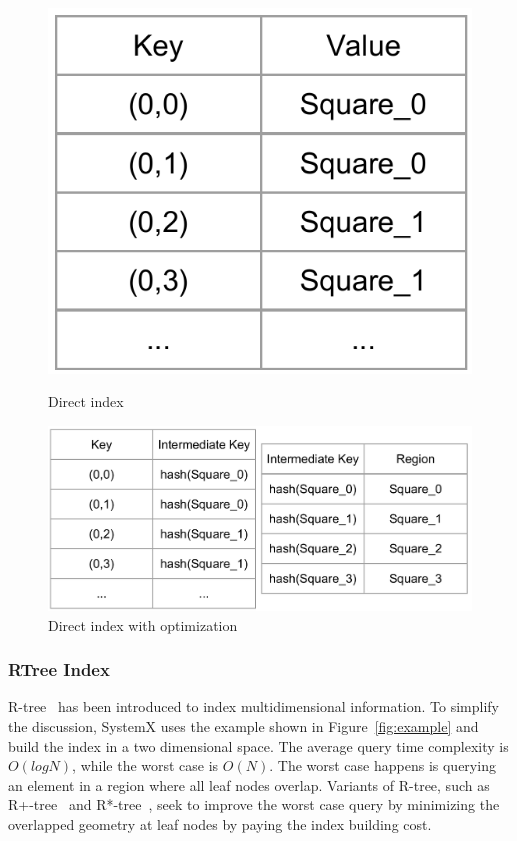 \documentclass{sig-alternate}
\begin{document}
\begin{figure}
\centering
\begin{minipage}{.3\linewidth}
  \includegraphics[width=\linewidth]{pictures/direct}
  \caption{Direct index}
  \label{fig:direct}
\end{minipage}
\hspace{.05\linewidth}
\begin{minipage}{.6\linewidth}
  \includegraphics[width=\linewidth]{pictures/direct-optimized}
  \caption{Direct index with optimization}
  \label{fig:direct-optimized}
\end{minipage}
\end{figure}


\subsubsection{RTree Index}
R-tree~\cite{guttman1984} has been introduced to index multidimensional information.
To simplify the discussion, SystemX uses the example shown in Figure~\ref{fig:example} and build the index in a two dimensional space.
The average query time complexity is $O(logN)$, while the worst case is $O(N)$. 
The worst case happens is querying an element in a region where all leaf nodes overlap.
Variants of R-tree, such as R+-tree~\cite{sellis1987} and R*-tree~\cite{beckmann1990}, 
seek to improve the worst case query by minimizing the overlapped geometry at leaf nodes 
by paying the index building cost.
\end{document}
